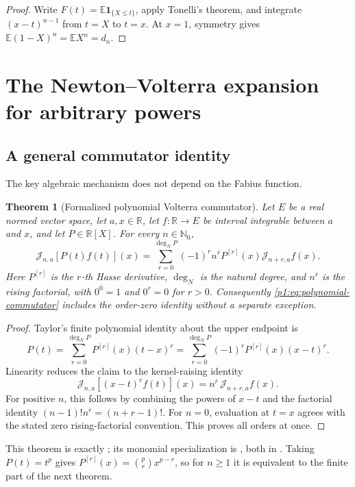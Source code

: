 \documentclass[11pt,oneside]{article}
\newtheorem{theorem}{Theorem}[section]
\theoremstyle{definition}
\theoremstyle{remark}
\newcommand{\E}{\mathbb E}
\newcommand{\R}{\mathbb R}
\newcommand{\N}{\mathbb N}
\newcommand{\rise}[2]{#1^{\overline{#2}}}
\newcommand{\Jn}{\mathcal J}
\newcommand{\1}{\mathbf 1}
\begin{document}
\begin{proof}
Write \(F(t)=\E\1_{\{X\leq t\}}\), apply Tonelli's theorem, and integrate
\((x-t)^{n-1}\) from \(t=X\) to \(t=x\).  At \(x=1\), symmetry gives
\(\E(1-X)^n=\E X^n=d_n\).
\end{proof}

\section{The Newton--Volterra expansion for arbitrary powers}

\subsection{A general commutator identity}
The key algebraic mechanism does not depend on the Fabius function.

\begin{theorem}[Formalized polynomial Volterra commutator]
\label{p1:thm:polynomial-commutator}
Let \(E\) be a real normed vector space, let \(a,x\in\R\), let
\(f:\R\to E\) be interval integrable between \(a\) and \(x\), and let
\(P\in\R[X]\).  For every \(n\in\N_0\),
\begin{equation}
 \boxed{\quad
 \Jn_{n,a}[P(t)f(t)](x)
 =\sum_{r=0}^{\deg_{\!N}P}(-1)^r\rise nr P^{[r]}(x)
   \Jn_{n+r,a}f(x).
 \quad}                                                       \label{p1:eq:polynomial-commutator}
\end{equation}
Here \(P^{[r]}\) is the \(r\)-th Hasse derivative,
\(\deg_{\!N}\) is the natural degree, and \(\rise nr\) is the rising
factorial, with \(\rise 00=1\) and \(\rise 0r=0\) for \(r>0\).
Consequently \eqref{p1:eq:polynomial-commutator} includes the order-zero
identity without a separate exception.
\end{theorem}

\begin{proof}
Taylor's finite polynomial identity about the upper endpoint is
\[
 P(t)=\sum_{r=0}^{\deg_{\!N}P}P^{[r]}(x)(t-x)^r
     =\sum_{r=0}^{\deg_{\!N}P}(-1)^rP^{[r]}(x)(x-t)^r.
\]
Linearity reduces the claim to the kernel-raising identity
\[
 \Jn_{n,a}[(x-t)^rf(t)](x)=\rise nr\,\Jn_{n+r,a}f(x).
\]
For positive \(n\), this follows by combining the powers of \(x-t\) and the
factorial identity \((n-1)!\rise nr=(n+r-1)!\).  For \(n=0\), evaluation at
\(t=x\) agrees with the stated zero rising-factorial convention.  This proves
all orders at once.
\end{proof}

This theorem is exactly
; its monomial specialization is
, both in
.  Taking \(P(t)=t^p\) gives
\(P^{[r]}(x)=\binom prx^{p-r}\), so for \(n\geq1\) it is equivalent to the
finite part of the next theorem.
\end{document}
